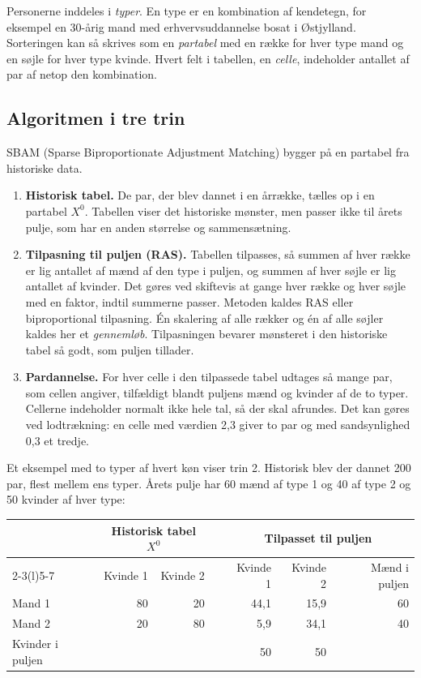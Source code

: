 \documentclass[11pt,a4paper]{article}
\begin{document}
Personerne inddeles i \emph{typer}. En type er en kombination af kendetegn, for eksempel en
30-årig mand med erhvervsuddannelse bosat i Østjylland. Sorteringen kan så skrives som en
\emph{partabel} med en række for hver type mand og en søjle for hver type kvinde. Hvert felt i
tabellen, en \emph{celle}, indeholder antallet af par af netop den kombination.

\subsection{Algoritmen i tre trin}

SBAM (Sparse Biproportionate Adjustment Matching) bygger på en partabel fra historiske data.

\begin{enumerate}
\item \textbf{Historisk tabel.} De par, der blev dannet i en årrække, tælles op i en partabel $X^0$.
Tabellen viser det historiske mønster, men passer ikke til årets pulje, som har en anden størrelse og
sammensætning.

\item \textbf{Tilpasning til puljen (RAS).} Tabellen tilpasses, så summen af hver række er lig
antallet af mænd af den type i puljen, og summen af hver søjle er lig antallet af kvinder. Det gøres
ved skiftevis at gange hver række og hver søjle med en faktor, indtil summerne passer. Metoden kaldes
RAS eller biproportional tilpasning. Én skalering af alle rækker og én af alle søjler kaldes her et
\emph{gennemløb}. Tilpasningen bevarer mønsteret i den historiske tabel så godt, som puljen
tillader.

\item \textbf{Pardannelse.} For hver celle i den tilpassede tabel udtages så mange par, som cellen
angiver, tilfældigt blandt puljens mænd og kvinder af de to typer. Cellerne indeholder normalt ikke
hele tal, så der skal afrundes. Det kan gøres ved lodtrækning: en celle med værdien 2,3 giver to par
og med sandsynlighed 0,3 et tredje.
\end{enumerate}

Et eksempel med to typer af hvert køn viser trin 2. Historisk blev der dannet 200 par, flest mellem
ens typer. Årets pulje har 60 mænd af type 1 og 40 af type 2 og 50 kvinder af hver type:

\begin{center}
\begin{tabular}{@{}lrrcrrr@{}}
\toprule
 & \multicolumn{2}{c}{Historisk tabel $X^0$} & & \multicolumn{3}{c}{Tilpasset til puljen} \\
\cmidrule(lr){2-3}\cmidrule(l){5-7}
 & Kvinde 1 & Kvinde 2 & & Kvinde 1 & Kvinde 2 & Mænd i puljen \\
\midrule
Mand 1 & 80 & 20 & & 44,1 & 15,9 & 60 \\
Mand 2 & 20 & 80 & & 5,9 & 34,1 & 40 \\
\midrule
Kvinder i puljen & & & & 50 & 50 & \\
\bottomrule
\end{tabular}
\end{center}
\end{document}
